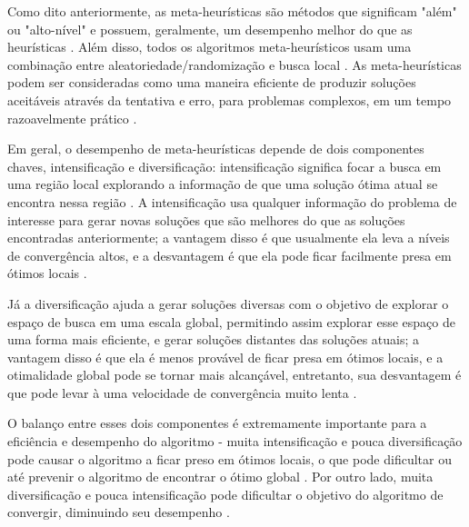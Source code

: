 
Como dito anteriormente, as meta-heurísticas são métodos que significam "além" \- ou "alto-nível" \- e possuem, geralmente, um desempenho melhor do que as heurísticas \cite{yang}. Além disso, todos os algoritmos meta-heurísticos usam uma combinação entre aleatoriedade/randomização e busca local \cite{yang}. As meta-heurísticas podem ser consideradas como uma maneira eficiente de produzir soluções aceitáveis através da tentativa e erro, para problemas complexos, em um tempo razoavelmente prático \cite{yang2}.

Em geral, o desempenho de meta-heurísticas depende de dois componentes chaves, intensificação e diversificação: intensificação significa focar a busca em uma região local explorando a informação de que uma solução ótima atual se encontra nessa região \cite{sahib}. A intensificação usa qualquer informação do problema de interesse para gerar novas soluções que são melhores do que as soluções encontradas anteriormente; a vantagem disso é que usualmente ela leva a níveis de convergência altos, e a desvantagem é que ela pode ficar facilmente presa em ótimos locais \cite{sahib}. 

Já a diversificação ajuda a gerar soluções diversas com o objetivo de explorar o espaço de busca em uma escala global, permitindo assim explorar esse espaço de uma forma mais eficiente, e gerar soluções distantes das soluções atuais; a vantagem disso é que ela é menos provável de ficar presa em ótimos locais, e a otimalidade global pode se tornar mais alcançável, entretanto, sua desvantagem é que pode levar à uma velocidade de convergência muito lenta \cite{sahib}.

O balanço entre esses dois componentes é extremamente importante para a eficiência e desempenho do algoritmo - muita intensificação e pouca diversificação pode causar o algoritmo a ficar preso em ótimos locais, o que pode dificultar ou até prevenir o algoritmo de encontrar o ótimo global \cite{yang2}. Por outro lado, muita diversificação e pouca intensificação pode dificultar o objetivo do algoritmo de convergir, diminuindo seu desempenho \cite{yang2}.


